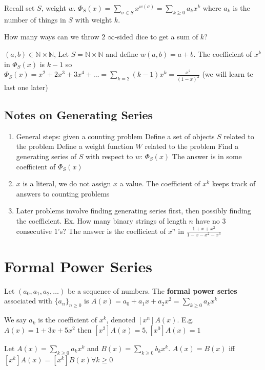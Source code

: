 \documentclass{article}
\begin{document}
Recall set $S$, weight $w$. $\Phi_S(x) = \sum_{\sigma \in S}x^{w(\sigma)} = \sum_{k \geq 0} a_kx^k$ where $a_k$ is the number of things in $S$ with weight $k$.

\example
How many ways can we throw $2$ $\infty$-sided dice to get a sum of $k$?

$(a,b) \in \mathbb{N} \times \mathbb{N}$, Let $S = \mathbb{N} \times \mathbb{N}$ and define $w(a,b) = a + b$. The coefficient of $x^k$ in $\Phi_S(x)$ is $k-1$ so $\Phi_S(x) = x^2 + 2x^3 + 3x^4 + \dots = \sum_{k = 2} (k-1)x^k = \frac{x^2}{(1-x)^2}$ (we will learn te last one later)

\subsection{Notes on Generating Series}
\begin{enumerate}
	\item General steps: given a counting problem
		\subitem Define a set of objects $S$ related to the problem
		\subitem Define a weight function $W$ related to the problem
		\subitem Find a generating series of $S$ with respect to $w$: $\Phi_S(x)$
		\subitem The answer is in some coefficient of $\Phi_S(x)$
	\item $x$ is a literal, we do not assign $x$ a value. The coefficient of $x^k$ keeps track of answers to counting problems
	\item Later problems involve finding generating series first, then possibly finding the coefficient. Ex. How many binary strings of length $n$ have no $3$ consecutive $1$'s? The answer is the coefficient of $x^n$ in $\frac{1+x+x^2}{1-x-x^2-x^3}$
\end{enumerate}

\section{Formal Power Series}
\begin{defn}
	Let $(a_0, a_1,a_2, \dots)$ be a sequence of numbers. The \textbf{formal power series} associated with $\{a_n\}_{n \geq 0}$ is $A(x) = a_0 + a_1x + a_2x^2 = \sum_{k \geq 0} a_kx^k$
	
\end{defn}

We say $a_k$ is the coefficient of $x^k$, denoted $[x^n]A(x)$. E.g. $A(x) = 1 + 3x+5x^2$ then $[x^2]A(x)=5, [x^0]A(x) = 1$

Let $A(x)  = \sum_{k\geq 0} a_kx^k$ and $B(x) = \sum_{k \geq 0} b_kx^k$. $A(x) = B(x)$ iff $[x^k]A(x) = [x^k]B(x) \forall k \geq 0$
\end{document}
